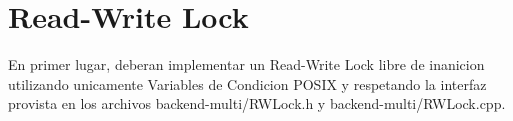 \section{Read-Write Lock}
En primer lugar, deberan implementar un Read-Write Lock libre de inanicion utilizando unicamente Variables de Condicion POSIX y respetando la interfaz provista en los archivos backend-multi/RWLock.h y backend-multi/RWLock.cpp.
 
 
